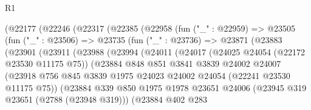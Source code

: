 \begin{lexlean}{R1}
\begin{coremodule}
                      (@22177
                        (@22246
                          (@22317
                            (@22385
                              (@22958
                                (fun ("_" : @22959) =>
                                @23505
                                  (fun ("_" : @23506) =>
                                  @23735
                                    (fun ("_" : @23736) =>
                                    @23871
                                      (@23883
                                        (@23901
                                          (@23911
                                            (@23988
                                              (@23994
                                                (@24011
                                                  (@24017
                                                    (@24025 @24054 (@22172 @23530 @11175 @75))
                                                    (@23884
                                                      @848
                                                      @851
                                                      @3841
                                                      @3839
                                                      @24002
                                                      @24007
                                                      (@23918
                                                        @756
                                                        @845
                                                        @3839
                                                        @1975
                                                        @24023
                                                        @24002
                                                        @24054
                                                        (@22241 @23530 @11175 @75))
                                                      (@23884
                                                        @339
                                                        @850
                                                        @1975
                                                        @1978
                                                        @23651
                                                        @24006
                                                        (@23945 @319 @23651 (@2788 (@23948 @319)))
                                                        (@23884
                                                          @402
                                                          @283

\end{coremodule}
\end{lexlean}
